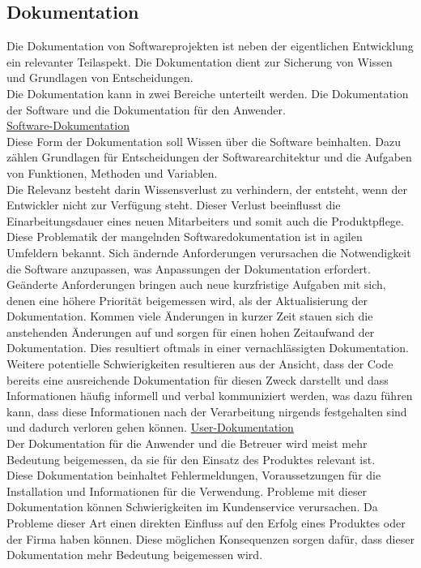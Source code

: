 \documentclass[12pt,a4paper]{article}
\begin{document}
\subsection{Dokumentation}
\label{Dokumenation}
Die Dokumentation von Softwareprojekten ist neben der eigentlichen Entwicklung ein relevanter Teilaspekt. Die Dokumentation dient zur Sicherung von Wissen und Grundlagen von Entscheidungen. \\
Die Dokumentation kann in zwei Bereiche unterteilt werden. Die Dokumentation der Software und die Dokumentation für den Anwender\cite{THEUNISSEN2022106733}.\\
\underline{Software-Dokumentation}\\
Diese Form der Dokumentation soll Wissen über die Software beinhalten. Dazu zählen Grundlagen für Entscheidungen der Softwarearchitektur und die Aufgaben von Funktionen, Methoden und Variablen.\\
Die Relevanz besteht darin Wissensverlust zu verhindern, der entsteht, wenn der Entwickler nicht zur Verfügung steht. Dieser Verlust beeinflusst die Einarbeitungsdauer eines neuen Mitarbeiters und somit auch die Produktpflege. \\
Diese Problematik der mangelnden Softwaredokumentation ist in agilen Umfeldern bekannt. Sich ändernde Anforderungen verursachen die Notwendigkeit die Software anzupassen, was Anpassungen der Dokumentation erfordert. Geänderte Anforderungen bringen auch neue kurzfristige Aufgaben mit sich, denen eine höhere Priorität beigemessen wird, als der Aktualisierung der Dokumentation. Kommen viele Änderungen in kurzer Zeit stauen sich die anstehenden Änderungen auf und sorgen für einen hohen Zeitaufwand der Dokumentation. Dies resultiert oftmals in einer vernachlässigten Dokumentation.\\
Weitere potentielle Schwierigkeiten resultieren aus der Ansicht, dass der Code bereits eine ausreichende Dokumentation für diesen Zweck darstellt und dass Informationen häufig informell und verbal kommuniziert werden, was dazu führen kann, dass diese Informationen nach der Verarbeitung nirgends festgehalten sind und dadurch verloren gehen können\cite{THEUNISSEN2022106733}.\newline
\noindent
\underline{User-Dokumentation}\\
Der Dokumentation für die Anwender und die Betreuer wird meist mehr Bedeutung beigemessen, da sie für den Einsatz des Produktes relevant ist.\\
Diese Dokumentation beinhaltet Fehlermeldungen, Voraussetzungen für die Installation und Informationen für die Verwendung. Probleme mit dieser Dokumentation können Schwierigkeiten im Kundenservice verursachen. Da Probleme dieser Art einen direkten Einfluss auf den Erfolg eines Produktes oder der Firma haben können. Diese möglichen Konsequenzen sorgen dafür, dass dieser Dokumentation mehr Bedeutung beigemessen wird\cite{THEUNISSEN2022106733}.
\end{document}
